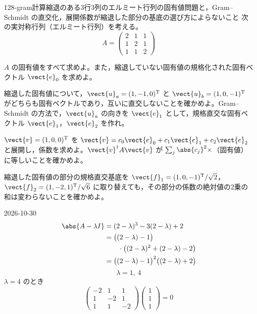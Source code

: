 \documentclass[uplatex,dvipdfmx,a4paper,11pt]{jsarticle}
\begin{document}
\begin{mondai}{128-gram}{計算}{縮退のある3行3列のエルミート行列の固有値問題と，Gram--Schmidt の直交化，展開係数が縮退した部分の基底の選び方によらないこと}
次の実対称行列（エルミート行列）を考える。
  \[ A=\begin{pmatrix} 2 & 1 & 1\\ 1 & 2 & 1\\ 1 & 1 & 2 \end{pmatrix} \]
  \begin{shoumon}
    \item $A$ の固有値をすべて求めよ。また，縮退していない固有値の規格化された固有ベクトル $\vect{e}_{0}$ を求めよ。
    \item 縮退した固有値について，$\vect{u}_{a}=(1,-1,0)^{\mathrm{T}}$ と $\vect{u}_{b}=(1,0,-1)^{\mathrm{T}}$ がどちらも固有ベクトルであり，互いに直交しないことを確かめよ。Gram--Schmidt の方法で，$\vect{u}_{a}$ の向きを $\vect{e}_{1}$ として，規格直交な固有ベクトル $\vect{e}_{1}$，$\vect{e}_{2}$ を作れ。
    \item $\vect{v}=(1,0,0)^{\mathrm{T}}$ を $\vect{v}=c_{0}\vect{e}_{0}+c_{1}\vect{e}_{1}+c_{2}\vect{e}_{2}$ と展開し，係数を求めよ。$\vect{v}^{\dagger}A\vect{v}$ が $\sum_{j}\abs{c_{j}}^{2}\times$（固有値）に等しいことを確かめよ。
    \item 縮退した固有値の部分の規格直交基底を $\vect{f}_{1}=(1,0,-1)^{\mathrm{T}}/\sqrt{2}$，$\vect{f}_{2}=(1,-2,1)^{\mathrm{T}}/\sqrt{6}$ に取り替えても，その部分の係数の絶対値の2乗の和は変わらないことを確かめよ。
  \end{shoumon}
\begin{kotaeutsushi}{2026-10-30}
\begin{align*}
\abs{A-\lambda I}&=(2-\lambda)^{3}-3(2-\lambda)+2\\
&=\bigl((2-\lambda)-1\bigr)\\
&\qquad\cdot\bigl((2-\lambda)^{2}+(2-\lambda)-2\bigr)\\
&=\bigl((2-\lambda)-1\bigr)^{2}\bigl((2-\lambda)+2\bigr)
\end{align*}
\[ \lambda=1,\ 4 \]
$\lambda=4$ のとき
\[ \begin{pmatrix}-2&1&1\\1&-2&1\\1&1&-2\end{pmatrix}\begin{pmatrix}1\\1\\1\end{pmatrix}=0 \]

\end{kotaeutsushi}
\end{mondai}
\end{document}
